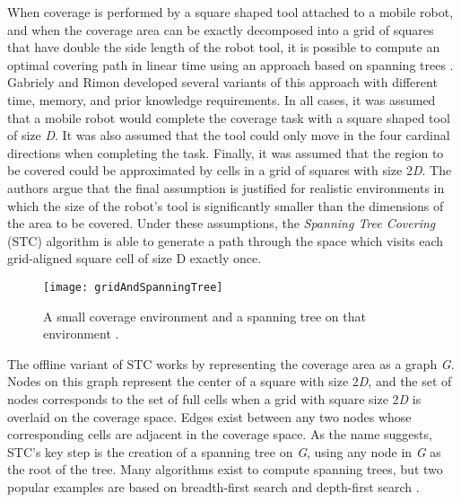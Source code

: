 When coverage is performed by a square shaped tool attached to a mobile robot, and when the coverage area can be exactly decomposed into a grid of squares that have double the side length of the robot tool, it is possible to compute an optimal covering path in linear time using an approach based on spanning trees \cite{STC}. Gabriely and Rimon developed several variants of this approach with different time, memory, and prior knowledge requirements. In all cases, it was assumed that a mobile robot would complete the coverage task with a square shaped tool of size \textit{D}. It was also assumed that the tool could only move in the four cardinal directions when completing the task. Finally, it was assumed that the region to be covered could be approximated by cells in a grid of squares with size 2\textit{D}. The authors argue that the final assumption is justified for realistic environments in which the size of the robot's tool is significantly smaller than the dimensions of the area to be covered. Under these assumptions, the \textit{Spanning Tree Covering} (STC) algorithm is able to generate a path through the space which visits each grid-aligned square cell of size D exactly once.

\begin{figure}[H]
\texttt{[image: gridAndSpanningTree]}
\caption[Spanning Tree Example]{A small coverage environment and a spanning tree on that environment \cite{STC}.}
\end{figure}

The offline variant of STC works by representing the coverage area as a graph \textit{G}. Nodes on this graph represent the center of a square with size 2\textit{D}, and the set of nodes corresponds to the set of full cells when a grid with square size 2\textit{D} is overlaid on the coverage space. Edges exist between any two nodes whose corresponding cells are adjacent in the coverage space. As the name suggests, STC's key step is the creation of a spanning tree on \textit{G}, using any node in \textit{G} as the root of the tree. Many algorithms exist to compute spanning trees, but two popular examples are based on breadth-first search and depth-first search \cite{CormenAlg}.

